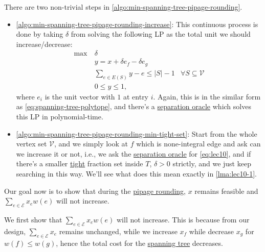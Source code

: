 \begin{remark}
	There are two non-trivial steps in \autoref{algo:min-spanning-tree-pipage-rounding}.
	\begin{itemize}
		\item \autoref{algo:min-spanning-tree-pipage-rounding-increase}: This continuous process is done by taking \(\delta \) from solving the following LP as the total unit we should increase/decrease:
		      \begin{equation}\label{eq:lec10}
			      \begin{aligned}
				      \max~ & \delta                                                                                    \\
				            & y = x+\delta e_f - \delta e_g                                                             \\
				            & \sum_{e\in E(S)} y- e \leq \left\vert S \right\vert - 1 & \forall S \subseteq \mathcal{V} \\
				            & 0 \leq y \leq 1,
			      \end{aligned}
		      \end{equation}
		      where \(e_i\) is the unit vector with \(1\) at entry \(i\). Again, this is in the similar form as \autoref{eq:spanning-tree-polytope}, and there's a \hyperref[rmk:separation-oracle]{separation oracle} which solves this LP in polynomial-time.
		\item \autoref{algo:min-spanning-tree-pipage-rounding-min-tight-set}: Start from the whole vertex set \(\mathcal{V} \), and we simply look at \(f\) which is none-integral edge and ask can we increase it or not, i.e., we ask the \hyperref[rmk:separation-oracle]{separation oracle} for \autoref{eq:lec10}, and if there's a smaller \hyperref[not:tight]{tight} fraction set inside \(T\), \(\delta > 0\) strictly, and we just keep searching in this way. We'll see what does this mean exactly in \autoref{lma:lec10-1}.
	\end{itemize}
\end{remark}

Our goal now is to show that during the \hyperref[algo:min-spanning-tree-pipage-rounding]{pipage rounding}, \(x\) remains feasible and \(\sum_{e\in \mathcal{E} } x_e w(e)\) will not increase.

We first show that \(\sum_{e\in \mathcal{E} } x_e w(e)\) will not increase. This is because from our design, \(\sum_{e\in \mathcal{E} }x_e \) remains unchanged, while we increase \(x_f\) while decrease \(x_g\) for \(w(f) \leq w(g)\), hence the total cost for the \hyperref[def:spanning-tree]{spanning tree} decreases.

